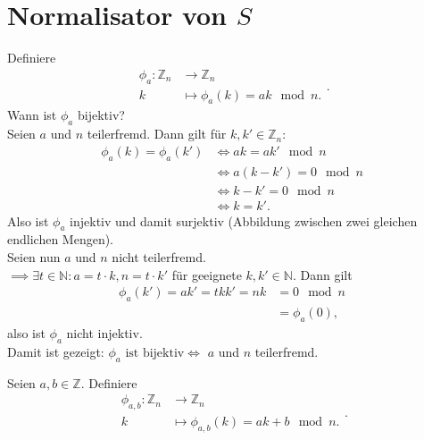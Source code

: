 \documentclass[a4paper]{article}
\newcommand{\N}{\mathbb{N}}
\newcommand{\Z}{\mathbb{Z}}
\begin{document}
    \section{Normalisator von $S$}
    \begin{bemerkung}
        Definiere
        \[
        \begin{align*}
            \phi_a: \Z_n &\longrightarrow \Z_n \\
            k &\longmapsto \phi_a(k) = ak \mod n
        .\end{align*}
        .\] 
        Wann ist $\phi_a$ bijektiv? \\
        Seien $a$ und $n$ teilerfremd. Dann gilt für $k, k' \in \Z_n:$ 
        \begin{align*}
            \phi_a(k) = \phi_a(k') &\iff ak = ak' \mod n \\
                                   &\iff a(k-k') = 0 \mod n \\
                                   &\iff k-k'  = 0 \mod n \\
                                   &\iff k = k'
        .\end{align*}
        Also ist $\phi_a$ injektiv und damit surjektiv (Abbildung zwischen zwei gleichen endlichen Mengen). \\
        Seien nun  $a$ und $n$ nicht teilerfremd. \\
         $\implies \exists t \in \N: a = t \cdot k, n = t \cdot k'$ für geeignete $k, k' \in \N$. Dann gilt
         \begin{align*}
             \phi_a(k') = a k' = t k k' = n k &= 0 \mod n \\
                                              &= \phi_a(0)
        , \end{align*} 
        also ist $\phi_a$ nicht injektiv. \\
        Damit ist gezeigt: $\phi_a \text{ ist bijektiv} \iff $ $a$ und  $n$ teilerfremd.
    \end{bemerkung}

    \begin{definition}
        Seien $a, b \in \Z.$ Definiere 
        \[
        \begin{align*}
            \phi_{a,b}: \Z_n &\longrightarrow \Z_n \\
            k &\longmapsto \phi_{a,b}(k) = ak + b \mod n
        .\end{align*}
        .\] 
    \end{definition}
\end{document}

